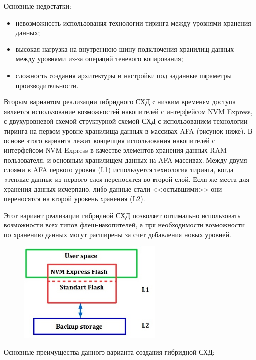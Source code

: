 \documentclass[10pt, a5paper]{article}
\begin{document}
Основные недостатки:

\begin{itemize}
  \item невозможность использования технологии тиринга между уровнями хранения данных;
  \item высокая нагрузка на внутреннюю шину подключения хранилищ данных между уровнями из-за операций теневого копирования;
  \item сложность создания архитектуры и настройки под заданные параметры производительности.
\end{itemize}

Вторым вариантом реализации гибридного СХД с низким временем доступа  является использование возможностей накопителей с интерфейсом NVM Express, с двухуровневой схемой структурной схемой СХД с использованием технологии тиринга на первом уровне хранилища данных в массивах AFA (рисунок ниже). В основе этого варианта лежит концепция использования накопителей с интерфейсом  NVM Express в качестве элементов хранения данных RAM пользователя, и основным хранилищем данных на AFA-массивах.  Между двумя слоями в AFA первого уровня (L1) используется технология тиринга, когда «теплые данные из первого слоя переносятся во второй слой. Если же места для хранения данных исчерпано, либо данные стали <<остывшими>> они переносятся на второй уровень хранения (L2).

Этот вариант реализации гибридной СХД позволяет оптимально использовать возможности всех типов флеш-накопителей, а при необходимости возможности по хранению данных могут расширены за счет добавления новых уровней.

\begin{center}
\begin{figure}[h!]
  \centering
  \includegraphics[width=7cm]{19_2018_Kliga2.jpg}
  \label{Kliga2}
\end{figure}
\end{center} 

Основные преимущества данного варианта создания гибридной СХД:
\end{document}
